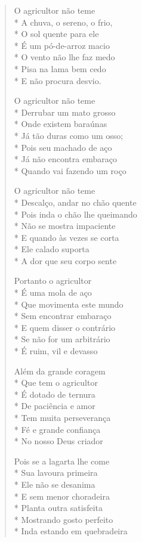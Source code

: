 \begin{verse}
O agricultor não teme\\*
A chuva, o sereno, o frio,\\*
O sol quente para ele\\*
É um pó-de-arroz macio\\*
O vento não lhe faz medo\\*
Pisa na lama bem cedo\\*
E não procura desvio.

O agricultor não teme\\*
Derrubar um mato grosso\\*
Onde existem baraúnas\\*
Já tão duras como um osso;\\*
Pois seu machado de aço\\*
Já não encontra embaraço\\*
Quando vai fazendo um roço

O agricultor não teme\\*
Descalço, andar no chão quente\\*
Pois inda o chão lhe queimando\\*
Não se mostra impaciente\\*
E quando às vezes se corta\\*
Ele calado suporta\\*
A dor que seu corpo sente

Portanto o agricultor\\*
É uma mola de aço\\*
Que movimenta este mundo\\*
Sem encontrar embaraço\\*
E quem disser o contrário\\*
Se não for um arbitrário\\*
É ruim, vil e devasso

Além da grande coragem\\*
Que tem o agricultor\\*
É dotado de ternura\\*
De paciência e amor\\*
Tem muita perseverança\\*
Fé e grande confiança\\*
No nosso Deus criador

Pois se a lagarta lhe come\\*
Sua lavoura primeira\\*
Ele não se desanima\\*
E sem menor choradeira\\*
Planta outra satisfeita\\*
Mostrando gosto perfeito\\*
Inda estando em quebradeira


\end{verse}
